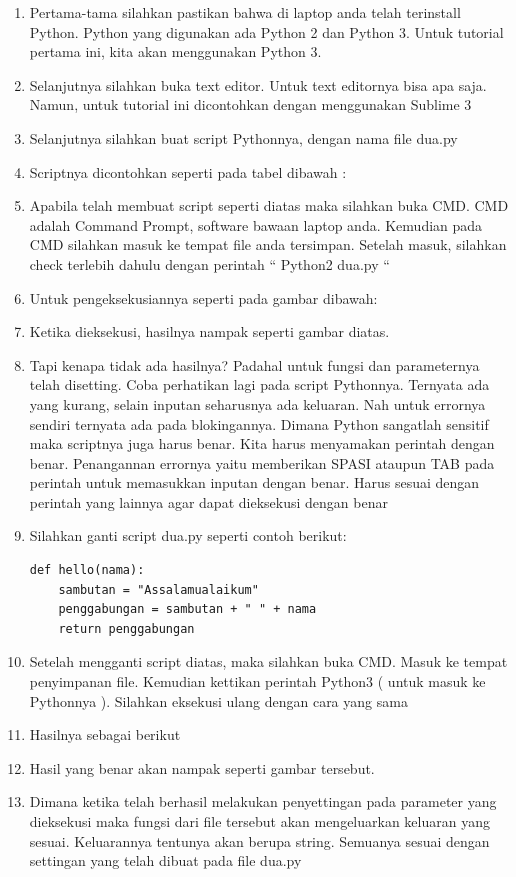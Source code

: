 \begin{enumerate}
\item Pertama-tama silahkan pastikan bahwa di laptop anda telah terinstall Python. Python yang digunakan ada Python 2 dan Python 3. Untuk tutorial pertama ini, kita akan menggunakan Python 3.
\item Selanjutnya silahkan buka text editor. Untuk text editornya bisa apa saja. Namun, untuk tutorial ini dicontohkan dengan menggunakan Sublime 3
\item Selanjutnya silahkan buat script Pythonnya, dengan nama file dua.py
\item Scriptnya dicontohkan seperti pada tabel dibawah :
\item Apabila telah membuat script seperti diatas maka silahkan buka CMD. CMD adalah Command Prompt, software bawaan laptop anda. Kemudian pada CMD silahkan masuk ke tempat file anda tersimpan. Setelah masuk, silahkan check terlebih dahulu dengan perintah “ Python2 dua.py “
\item Untuk pengeksekusiannya seperti pada gambar dibawah:
\item Ketika dieksekusi, hasilnya nampak seperti gambar diatas.
\item Tapi kenapa tidak ada hasilnya? Padahal untuk fungsi dan parameternya telah disetting. Coba perhatikan lagi pada script Pythonnya. Ternyata ada yang kurang, selain inputan seharusnya ada keluaran. Nah untuk errornya sendiri ternyata ada pada blokingannya. Dimana Python sangatlah sensitif maka scriptnya juga harus benar. Kita harus menyamakan perintah dengan benar. Penangannan errornya yaitu memberikan SPASI ataupun TAB pada perintah untuk memasukkan inputan dengan benar. Harus sesuai dengan perintah yang lainnya agar dapat dieksekusi dengan benar
\item Silahkan ganti script dua.py seperti contoh berikut:
\begin{verbatim}
def hello(nama):
	sambutan = "Assalamualaikum"
	penggabungan = sambutan + " " + nama
	return penggabungan
\end{verbatim}
\item Setelah mengganti script diatas, maka silahkan buka CMD. Masuk ke tempat penyimpanan file. Kemudian kettikan perintah Python3 ( untuk masuk ke Pythonnya ). Silahkan eksekusi ulang dengan cara yang sama
\item Hasilnya sebagai berikut
\item Hasil yang benar akan nampak seperti gambar tersebut.
\item Dimana ketika telah berhasil melakukan penyettingan pada parameter yang dieksekusi maka fungsi dari file tersebut akan mengeluarkan keluaran yang sesuai. Keluarannya tentunya akan berupa string. Semuanya sesuai dengan settingan yang telah dibuat pada file dua.py
\end{enumerate}

